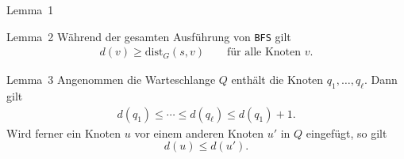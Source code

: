 \documentclass[aspectratio=1610, 11pt]{beamer}
\newcommand\dist{\mathrm{dist}}
\begin{document}
\begin{frame}
\begin{overprint}
\begin{block}{Lemma~1}
		\end{block}
		\begin{block}{Lemma~2}
			W\"ahrend der gesamten Ausf\"uhrung von {\tt BFS} gilt 
			\begin{align*}
				d(v)\geq\dist_G(s,v)\qquad\mbox{f\"ur alle Knoten $v$}.
			\end{align*}
		\end{block}
		\begin{block}{Lemma~3}
			Angenommen die Warteschlange $Q$ enth\"alt die Knoten $q_1,\ldots,q_\ell$.
			Dann gilt 
			\begin{align*}
				d(q_1)\leq\cdots\leq d(q_\ell)\leq d(q_1)+1.
			\end{align*}
			Wird ferner ein Knoten $u$ vor einem anderen Knoten $u'$ in $Q$ eingef\"ugt, so gilt $$d(u)\leq d(u').$$
		\end{block}
	\end{overprint}
\end{frame}
\end{document}
